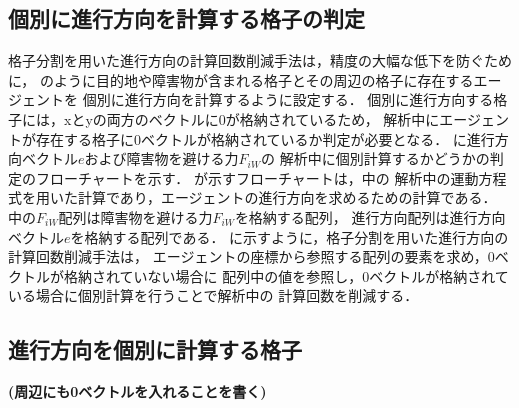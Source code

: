 \subsection{個別に進行方向を計算する格子の判定}
格子分割を用いた進行方向の計算回数削減手法は，精度の大幅な低下を防ぐために，
のように目的地や障害物が含まれる格子とその周辺の格子に存在するエージェントを
個別に進行方向を計算するように設定する．
個別に進行方向する格子には，xとyの両方のベクトルに0が格納されているため，
解析中にエージェントが存在する格子に0ベクトルが格納されているか判定が必要となる．
に進行方向ベクトル$e$および障害物を避ける力$F_{iW}$の
解析中に個別計算するかどうかの判定のフローチャートを示す．
が示すフローチャートは，中の
解析中の運動方程式を用いた計算であり，エージェントの進行方向を求めるための計算である．
中の$F_{iW}$配列は障害物を避ける力$F_{iW}$を格納する配列，
進行方向配列は進行方向ベクトル$e$を格納する配列である．
に示すように，格子分割を用いた進行方向の計算回数削減手法は，
エージェントの座標から参照する配列の要素を求め，0ベクトルが格納されていない場合に
配列中の値を参照し，0ベクトルが格納されている場合に個別計算を行うことで解析中の
計算回数を削減する．



\clearpage
\subsection{進行方向を個別に計算する格子}
\textbf{(周辺にも0ベクトルを入れることを書く)}




\clearpage
